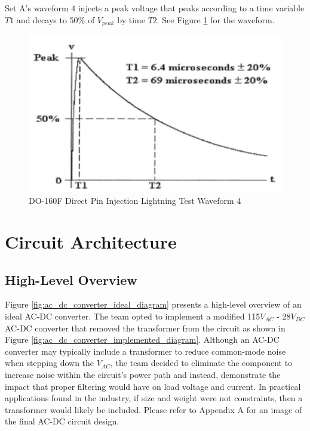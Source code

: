 \documentclass[conference]{IEEEtran}
\begin{document}
Set A's waveform 4 injects a peak voltage that peaks according to a time variable ${T1}$ and decays to 50\% of $V_{peak}$ by time ${T2}$. See Figure \ref{fig:do-160f_waveform_set_4_diagram} for the waveform.

\begin{figure}[hp]
    \centering
    \includegraphics[width=1.0\linewidth]{do-160f_waveform_set_4.png}
    \caption{DO-160F Direct Pin Injection Lightning Test Waveform 4}
    \label{fig:do-160f_waveform_set_4_diagram}
\end{figure}

\section{Circuit Architecture}

\subsection{High-Level Overview}

Figure \ref{fig:ac_dc_converter_ideal_diagram} presents a high-level overview of an ideal AC-DC converter. The team opted to implement a modified 115$V_{AC}$ - 28$V_{DC}$ AC-DC converter that removed the transformer from the circuit as shown in Figure \ref{fig:ac_dc_converter_implemented_diagram}. Although an AC-DC converter may typically include a transformer to reduce common-mode noise when stepping down the $V_{AC}$, the team decided to eliminate the component to increase noise within the circuit's power path and instead, demonstrate the impact that proper filtering would have on load voltage and current. In practical applications found in the industry, if size and weight were not constraints, then a transformer would likely be included. Please refer to Appendix A for an image of the final AC-DC circuit design.
\end{document}

